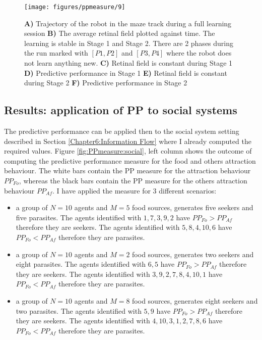 \begin{figure}[!hbt]
	\begin{center}
		\texttt{[image: figures/ppmeasure/9]}
	\end{center}
	\caption[Full learning robot on the maze track]{
	{\bf A)} Trajectory of the robot in the maze track during a full learning session
	{\bf B)} The average retinal field plotted against time. The learning is stable in Stage 1 and Stage 2.
There are 2 phases during the run marked with $[P1,P2]$ and $[P3,P4]$ where the robot does not learn
anything new.
	{\bf C)} Retinal field is constant during Stage 1
	{\bf D)} Predictive performance in Stage 1 
	{\bf E)} Retinal field is constant during Stage 2
	{\bf F)} Predictive performance in Stage 2 
	\label{PPmeasure:MazeFinalLearning}
	}
\end{figure}

\subsection{Results: application of PP to social systems}
\label{Chapter8:PPsocial}
The predictive performance can be applied then to the social system
setting described in Section \ref{Chapter6:Information Flow} where
I already computed the required values.
Figure \ref{fig:PPmeasure:social}, left column shows the outcome of computing the predictive
performance measure for the food and others attraction behaviour.
The white bars contain the PP measure for the attraction behaviour $PP_{Fo}$, whereas
the black bars contain the PP measure for the others attraction behaviour $PP_{Af}$.
I have applied the measure for 3 different scenarios:
\begin{itemize}
 \item a group of $N=10$ agents and $M=5$ food sources, generates five seekers and five parasites.
The agents identified with $1,7,3,9,2$ have $PP_{Fo}> PP_{Af}$ therefore they are
seekers.
The agents identified with $5,8,4,10,6$ have $PP_{Fo}< PP_{Af}$ therefore they are
parasites.
 \item a group of $N=10$ agents and $M=2$ food sources, generates two seekers and eight parasites.
The agents identified with $6,5$ have $PP_{Fo}> PP_{Af}$ therefore they are
seekers.
The agents identified with $3,9,2,7,8,4,10,1$ have $PP_{Fo}< PP_{Af}$ therefore they are
parasites.
 \item a group of $N=10$ agents and $M=8$ food sources, generates eight seekers and two parasites.
The agents identified with $5,9$ have $PP_{Fo}> PP_{Af}$ therefore they are
seekers.
The agents identified with $4,10,3,1,2,7,8,6$ have $PP_{Fo}< PP_{Af}$ therefore they are
parasites.
\end{itemize}


